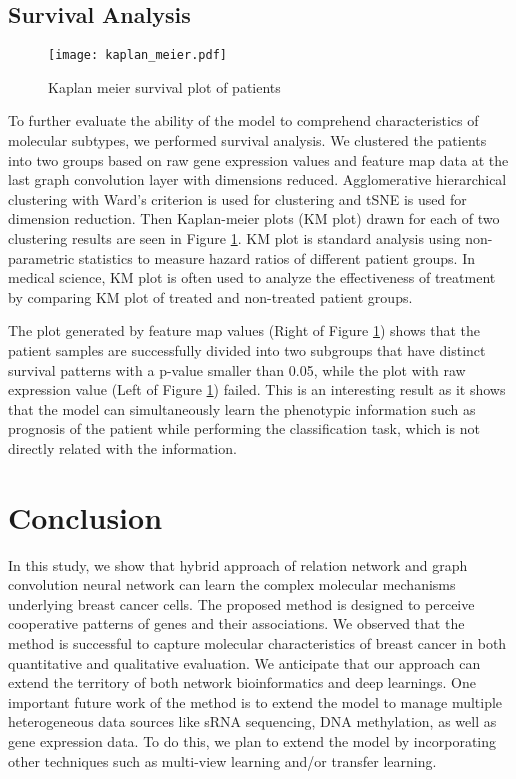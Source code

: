 \documentclass{article}
\begin{document}
\subsection{Survival Analysis}

\begin{figure}[!t]
\centering
\texttt{[image: kaplan\_meier.pdf]}
\caption{Kaplan meier survival plot of patients}
\label{fig_KM}
\end{figure}



To further evaluate the ability of the model to comprehend characteristics of molecular subtypes, we performed survival analysis. 
We clustered the patients into two groups based on raw gene expression values and feature map data at the last graph convolution layer with dimensions reduced.
Agglomerative hierarchical clustering with Ward's criterion \cite{ward1963hierarchical} is used for clustering and tSNE is used for dimension reduction. Then Kaplan-meier plots (KM plot) \cite{kaplan1958nonparametric} drawn for each of two clustering results are seen in Figure \ref{fig_KM}. 
KM plot is standard analysis using non-parametric statistics to measure hazard ratios of different patient groups. In medical science, KM plot is often used to analyze the effectiveness of treatment by comparing KM plot of treated and non-treated patient groups.

The plot generated by feature map values (Right of Figure \ref{fig_KM}) shows that the patient samples are successfully divided into two subgroups that have distinct survival patterns with a p-value smaller than 0.05, while the plot with raw expression value (Left of Figure \ref{fig_KM}) failed. This is an interesting result as it shows that the model can simultaneously learn the phenotypic information such as prognosis of the patient while performing the classification task, which is not directly related with the information.


\section{Conclusion}
In this study, we show that hybrid approach of relation network and graph convolution neural network can learn the complex molecular mechanisms underlying breast cancer cells.
The proposed method is designed to perceive cooperative patterns of genes and their associations.
We observed that the method is successful to capture molecular characteristics of breast cancer in both quantitative and qualitative evaluation.
We anticipate that our approach can extend the territory of both network bioinformatics and deep learnings.
One important future work of the method is to extend the model to manage multiple heterogeneous data sources like sRNA sequencing, DNA methylation, as well as gene expression data. To do this, we plan to extend the model by incorporating other techniques such as multi-view learning and/or transfer learning.
\end{document}
